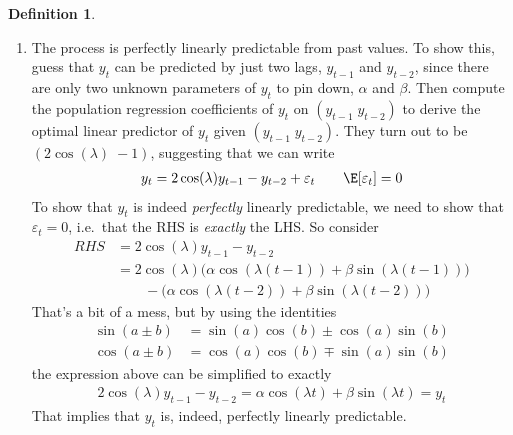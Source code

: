\documentclass[12pt]{article}
\theoremstyle{plain}
\theoremstyle{definition}
\newtheorem{defn}[thm]{Definition}
\theoremstyle{remark}
\begin{document}
\begin{defn}
\begin{enumerate}[label=(\roman*)]
  \item
    The process is perfectly linearly predictable from past values.
    To show this, guess that $y_t$ can be predicted by just two lags,
    $y_{t-1}$ and $y_{t-2}$, since there are only two unknown parameters
    of $y_t$ to pin down, $\alpha$ and $\beta$. Then compute the
    population regression coefficients of $y_t$ on $(y_{t-1}\;y_{t-2})$
    to derive the optimal linear predictor of $y_t$ given
    $(y_{t-1}\;y_{t-2})$. They turn out to be $(2\cos(\lambda)\; -1)$,
    suggesting that we can write
    \begin{align*}
      y_t = 2\cos(\lambda) y_{t-1} - y_{t-2} + \varepsilon_t
      \qquad \E[\varepsilon_t] = 0
    \end{align*}
    To show that $y_t$ is indeed \emph{perfectly} linearly predictable,
    we need to show that $\varepsilon_t=0$, i.e.\ that the RHS is
    \emph{exactly} the LHS. So consider
    \begin{align*}
      RHS &= 2\cos(\lambda) y_{t-1} - y_{t-2} \\
      &= 2\cos(\lambda)\big(
          \alpha \cos(\lambda(t-1)) + \beta\sin(\lambda(t-1))
          \big) \\
        &\qquad
        -\big(
          \alpha \cos(\lambda(t-2)) + \beta\sin(\lambda(t-2))
        \big)
    \end{align*}
    That's a bit of a mess, but by using the identities
    \begin{align*}
      \sin(a\pm b) &= \sin(a)\cos(b) \pm \cos(a)\sin(b)
      \\
      \cos(a\pm b) &= \cos(a)\cos(b) \mp \sin(a)\sin(b)
    \end{align*}
    the expression above can be simplified to exactly
    \begin{align*}
      2\cos(\lambda) y_{t-1} - y_{t-2}
      = \alpha \cos(\lambda t) + \beta \sin(\lambda t)
      = y_t
    \end{align*}
    That implies that $y_t$ is, indeed, perfectly linearly predictable.
\end{enumerate}
\end{defn}
\end{document}
